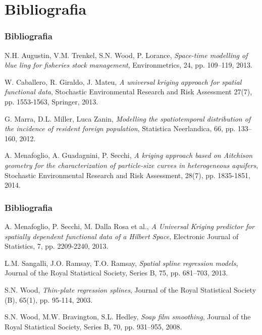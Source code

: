 \documentclass[landscape,9pt]{beamer}                           %
\begin{document}
\section{Bibliografia}
\begin{frame}[noframenumbering]
\frametitle{Bibliografia}

N.H. Augustin, V.M. Trenkel, S.N. Wood, P. Lorance, \emph{Space-time modelling of blue ling for fisheries stock management}, Environmetrics, 24, pp. 109–119, 2013.
\par\bigskip
W. Caballero, R. Giraldo, J. Mateu, \emph{A universal kriging approach for spatial functional data}, Stochastic Environmental Research and Risk Assessment 27(7), pp. 1553-1563, Springer, 2013.
\par\bigskip
G. Marra, D.L. Miller, Luca Zanin, \emph{Modelling the spatiotemporal distribution of the incidence of resident foreign population}, Statistica Neerlandica, 66, pp. 133–160, 2012.
\par\bigskip
A. Menafoglio, A. Guadagnini, P. Secchi, \emph{A kriging approach based on Aitchison geometry for the characterization of particle-size curves in heterogeneous aquifers}, Stochastic Environmental Research and Risk Assessment, 28(7), pp. 1835-1851, 2014.
\par\bigskip
\begin{flushright}
[segue]
\end{flushright}
\end{frame}

\begin{frame}[noframenumbering]
\frametitle{Bibliografia}

A. Menafoglio, P. Secchi, M. Dalla Rosa et al., \emph{A Universal Kriging predictor for spatially dependent functional data of a Hilbert Space}, Electronic Journal of Statistics, 7, pp. 2209-2240, 2013.
\par\bigskip
L.M. Sangalli, J.O. Ramsay, T.O. Ramsay, \emph{Spatial spline regression models}, Journal of the Royal Statistical Society, Series B, 75, pp. 681–703, 2013.
\par\bigskip
S.N. Wood, \emph{Thin-plate regression splines}, Journal of the Royal Statistical Society (B), 65(1), pp. 95-114, 2003.
\par\bigskip
S.N. Wood, M.W. Bravington, S.L. Hedley, \emph{Soap film smoothing}, Journal of the Royal Statistical Society, Series B, 70, pp. 931–955, 2008.

\end{frame}
\end{document}
